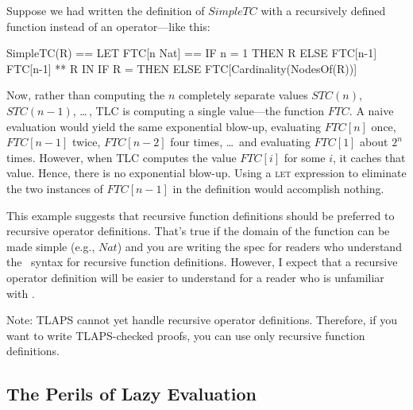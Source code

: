 \documentclass[fleqn,leqno]{article}
\begin{document}
Suppose we had written the definition of $SimpleTC$ with a 
recursively
defined function instead of an operator---like this:
\begin{display}
\begin{notla}
SimpleTC(R) ==
  LET FTC[n \in Nat] == IF n = 1 THEN R
                                 ELSE FTC[n-1]  \cup  FTC[n-1]  **  R
  IN IF R = {} THEN {} ELSE FTC[Cardinality(NodesOf(R))]
\end{notla}
\begin{tlatex}
%
\end{tlatex}
\end{display}
Now, rather than computing the $n$ completely separate values
$STC(n)$, $STC(n-1)$, \ldots\,, TLC is computing a single value---the
function $FTC$.  A naive evaluation would yield the same exponential
blow-up, evaluating $FTC[n]$ once, $FTC[n-1]$ twice, $FTC[n-2]$ four
times, \ldots\, and evaluating $FTC[1]$ about $2^{n}$ times.  However,
when TLC computes the value $FTC[i]$ for some $i$, it caches that
value.  Hence, there is no exponential blow-up.  Using a \textsc{let}
expression to eliminate the two instances of $FTC[n-1]$ in the
definition would accomplish nothing.

This example suggests that recursive function definitions should be
preferred to recursive operator definitions.  That's true if the
domain of the function can be made simple (e.g., $Nat$) and you are
writing the spec for readers who understand the \tlaplus\ syntax for
recursive function definitions.  However, I expect that a recursive
operator definition will be easier to understand for a reader
who is unfamiliar with \tlaplus.

Note: TLAPS cannot yet handle recursive operator definitions.  Therefore,
if you want to write TLAPS-checked proofs, you can use only recursive
function definitions.

\subsection[The Perils of Lazy Evaluation]{The Perils of Lazy Evaluation%
} 
\end{document}
